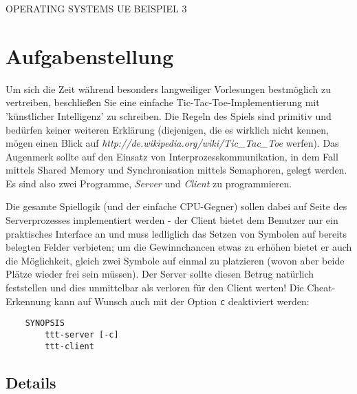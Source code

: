 \documentclass{article}
\begin{document}
\begin{center}
\LARGE OPERATING SYSTEMS UE BEISPIEL 3
\end{center}

\section*{Aufgabenstellung}

Um sich die Zeit während besonders langweiliger Vorlesungen bestmöglich
zu vertreiben, beschließen Sie eine einfache Tic-Tac-Toe-Implementierung
mit 'künstlicher Intelligenz' zu schreiben. Die Regeln des Spiels sind
primitiv und bedürfen keiner weiteren Erklärung (diejenigen, die es wirklich nicht
kennen, mögen einen Blick auf \textit{http://de.wikipedia.org/wiki/Tic\_Tac\_Toe}
werfen). Das Augenmerk sollte auf den Einsatz von Interprozesskommunikation, in dem Fall 
mittels Shared Memory und Synchronisation mittels Semaphoren, gelegt werden. \\
Es sind also zwei Programme, \textit{Server} und \textit{Client} zu programmieren.

Die gesamte Spiellogik (und der einfache CPU-Gegner) sollen dabei auf Seite des 
Serverprozesses implementiert werden - der Client bietet dem Benutzer nur
ein praktisches Interface an und muss ledliglich das Setzen von Symbolen auf
bereits belegten Felder verbieten; um die Gewinnchancen etwas zu erhöhen bietet
er auch die Möglichkeit, gleich zwei Symbole auf einmal zu platzieren (wovon
aber beide Plätze wieder frei sein müssen). Der Server sollte diesen Betrug
natürlich feststellen und dies unmittelbar als verloren für den Client werten!
Die Cheat-Erkennung kann auf Wunsch auch mit der Option \texttt{c} deaktiviert
werden:

\begin{verbatim}
    SYNOPSIS
        ttt-server [-c]
        ttt-client 
\end{verbatim}

\subsection*{Details}
\end{document}
